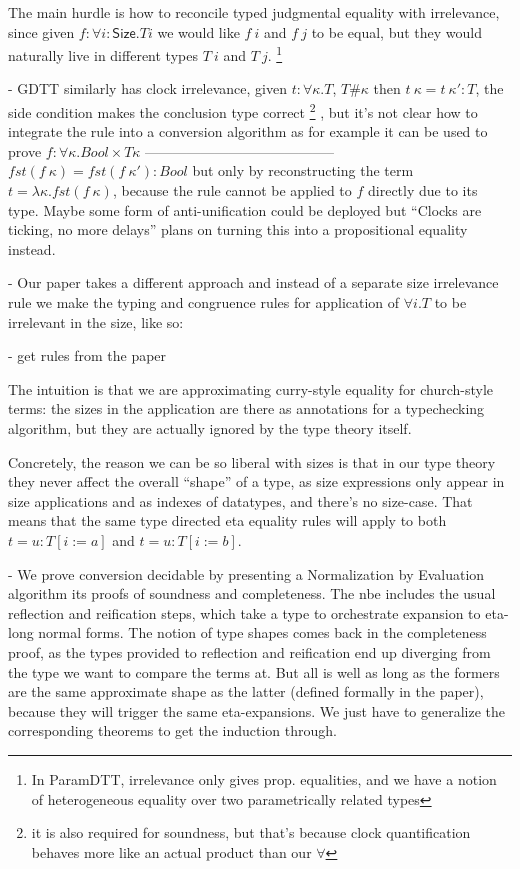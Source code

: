 \documentclass{article}
\begin{document}
    The main hurdle is how to reconcile typed judgmental equality with
    irrelevance, since given $f : \forall i : \mathsf{Size}. T i$ we would like
    $f~i$ and $f~j$ to be equal, but they would naturally live in
    different types $T~i$ and $T~j$.
    \footnote{In ParamDTT, irrelevance only gives prop. equalities,
      and we have a notion of heterogeneous equality over two
      parametrically related types}
    
    - GDTT similarly has clock irrelevance, given $t : \forall
    \kappa. T$, $T \# \kappa$ then $t~\kappa = t~\kappa' : T$, the
    side condition makes the conclusion type correct
    \footnote{it is also required for soundness, but that's because
      clock quantification behaves more like an actual product than
      our $\forall$}
    , but it's not clear how to integrate the rule into a conversion
    algorithm as for example it can be used to prove
    $f : \forall \kappa. Bool \times T \kappa$
    -----------------------------------------
    $fst (f~\kappa) = fst (f~\kappa') : Bool$
    but only by reconstructing the term $t = \lambda \kappa. fst
    (f~\kappa)$, because the rule cannot be applied to $f$ directly
    due to its type.
    Maybe some form of anti-unification could be deployed but ``Clocks
    are ticking, no more delays'' plans on turning this into a
    propositional equality instead.
    
    - Our paper takes a different approach and instead of a separate
    size irrelevance rule we make the typing and congruence rules for
    application of $\forall i. T$ to be irrelevant in the size, like so:

      - get rules from the paper

   The intuition is that we are approximating curry-style equality for
   church-style terms: the sizes in the application are there as
   annotations for a typechecking algorithm, but they are actually
   ignored by the type theory itself.

   Concretely, the reason we can be so liberal with sizes is that
   in our type theory they never affect the overall ``shape'' of a
   type, as size expressions only appear in size applications and as
   indexes of datatypes, and there's no size-case. That means that the
   same type directed eta equality rules will apply to both $t = u :
   T[i:=a]$ and $t = u : T[i:=b]$.

   - We prove conversion decidable by presenting a Normalization by
   Evaluation algorithm its proofs of soundness and completeness.
   The nbe includes the usual reflection and reification steps, which
   take a type to orchestrate expansion to eta-long normal forms.   
   The notion of type shapes comes back in the completeness proof, as
   the types provided to reflection and reification end up diverging
   from the type we want to compare the terms at. 
   But all is well as long as the formers are the same approximate
   shape as the latter (defined formally in the paper), because they
   will trigger the same eta-expansions.
   We just have to generalize the corresponding theorems to get the
   induction through.
   
\end{document}
